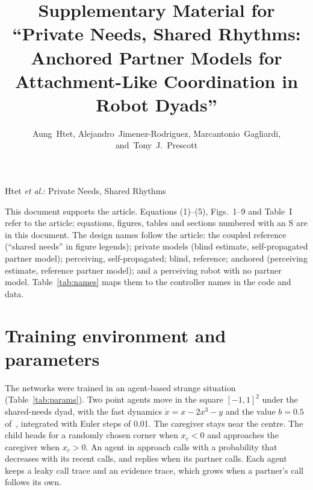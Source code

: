 \documentclass[journal]{IEEEtran}
\begin{document}
\title{Supplementary Material for ``Private Needs, Shared Rhythms: Anchored Partner Models for Attachment-Like Coordination in Robot Dyads''}

\author{Aung~Htet,
        Alejandro~Jimenez-Rodriguez,
        Marcantonio~Gagliardi,
        and~Tony~J.~Prescott}

%
{Htet \MakeLowercase{\textit{et al.}}: Private Needs, Shared Rhythms}

\maketitle

\noindent This document supports the article. Equations (1)--(5), Figs.~1--9 and Table~I refer to the article; equations, figures, tables and sections numbered with an S are in this document. The design names follow the article: the coupled reference (``shared needs'' in figure legends); private models (blind estimate, self-propagated partner model); perceiving, self-propagated; blind, reference; anchored (perceiving estimate, reference partner model); and a perceiving robot with no partner model. Table~\ref{tab:names} maps them to the controller names in the code and data.

\section{Training environment and parameters}
\label{sec:training}
The networks were trained in an agent-based strange situation (Table~\ref{tab:params}). Two point agents move in the square $[-1,1]^2$ under the shared-needs dyad, with the fast dynamics $\dot{x}=x-2x^3-y$ and the value $b=0.5$ of~\cite{Htet2024}, integrated with Euler steps of 0.01. The caregiver stays near the centre. The child heads for a randomly chosen corner when $x_c<0$ and approaches the caregiver when $x_c>0$. An agent in approach calls with a probability that decreases with its recent calls, and replies when its partner calls. Each agent keeps a leaky call trace and an evidence trace, which grows when a partner's call follows its own.
\end{document}

